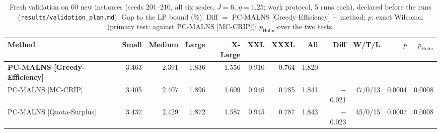\begin{table}[pos=!htb]
\centering
\caption{Fresh validation on 60 new instances (seeds 201--210, all six scales, $J = 6$, $\eta = 1.25$; work protocol, 5 runs each), declared before the runs (\texttt{results/validation\_plan.md}). Gap to the LP bound (\%). Diff $=$ PC-MALNS [Greedy-Efficiency] $-$ method; $p$: exact Wilcoxon (primary test: against PC-MALNS [MC-CRIP]); $p_{\text{Holm}}$ over the two tests.}
\label{tab:validation}
\scriptsize
\begin{tabular}{@{}lrrrrrrrrrrr@{}}
\toprule
Method & Small & Medium & Large & X-Large & XXL & XXXL & All & Diff & W/T/L & $p$ & $p_{\text{Holm}}$ \\
\midrule
\textbf{PC-MALNS [Greedy-Efficiency]} & 3.463 & 2.391 & 1.836 & 1.556 & 0.910 & 0.764 & 1.820 &  &  &  &  \\
PC-MALNS [MC-CRIP] & 3.405 & 2.407 & 1.896 & 1.609 & 0.946 & 0.785 & 1.841 & $-$0.021 & 47/0/13 & 0.0004 & 0.0008 \\
PC-MALNS [Quota-Surplus] & 3.437 & 2.429 & 1.872 & 1.587 & 0.945 & 0.787 & 1.843 & $-$0.023 & 45/0/15 & 0.0007 & 0.0008 \\
\bottomrule
\end{tabular}
\end{table}
